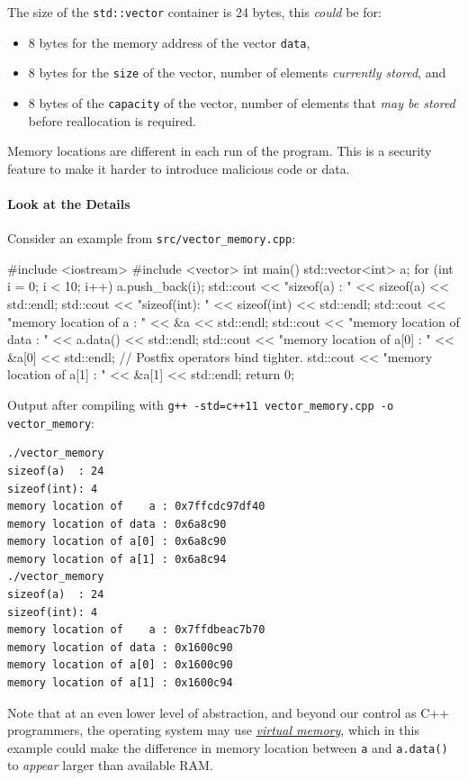\documentclass[12pt,letterpaper,twoside]{article}
\begin{document}
The size of the \texttt{std::vector} container is 24 bytes, this \emph{could}
be for:
\begin{itemize}
  \item 8 bytes for the memory address of the vector \texttt{data},
  \item 8 bytes for the \texttt{size} of the vector, number of elements \emph{currently stored}, and
  \item 8 bytes of the \texttt{capacity} of the vector, number of elements that 
    \emph{may be stored} before reallocation is required.
\end{itemize}
Memory locations are different in each run of the program. This is a
security feature to make it harder to introduce malicious code or
data.

\paragraph{Look at the Details} Consider an example from
\texttt{src/vector\_memory.cpp}:

\begin{cpp}
#include <iostream>
#include <vector>
 int main() {
  std::vector<int> a;
  for (int i = 0; i < 10; i++)
      a.push_back(i);
  std::cout << "sizeof(a)  : " << sizeof(a)   << std::endl;
  std::cout << "sizeof(int): " << sizeof(int) << std::endl;
  std::cout << "memory location of    a : " << &a << std::endl;
  std::cout << "memory location of data : " << a.data() << std::endl;
  std::cout << "memory location of a[0] : " << &a[0] << std::endl;  // Postfix operators bind tighter.
  std::cout << "memory location of a[1] : " << &a[1] << std::endl;
  return 0;
}
\end{cpp}

Output after compiling with \texttt{g++ -std=c++11 vector\_memory.cpp -o vector\_memory}:

{
\footnotesize
\begin{verbatim}
./vector_memory
sizeof(a)  : 24
sizeof(int): 4
memory location of    a : 0x7ffcdc97df40
memory location of data : 0x6a8c90
memory location of a[0] : 0x6a8c90
memory location of a[1] : 0x6a8c94
./vector_memory
sizeof(a)  : 24
sizeof(int): 4
memory location of    a : 0x7ffdbeac7b70
memory location of data : 0x1600c90
memory location of a[0] : 0x1600c90
memory location of a[1] : 0x1600c94
\end{verbatim}
}

Note that at an even lower level of abstraction, and beyond our control as C++ programmers, 
the operating system may use 
\href{https://en.wikipedia.org/wiki/Virtual_memory}{\emph{virtual memory}}, which in this example
could make the difference in memory location between \texttt{a} and \texttt{a.data()} to 
\emph{appear} larger than available RAM.
\end{document}
